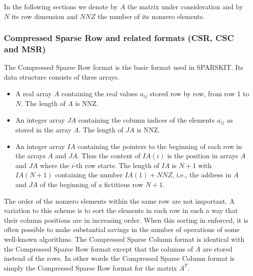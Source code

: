 In the following sections we denote by $A$ the matrix under
consideration and by $N$ its row dimension and $NNZ$ the number of its
nonzero elements.

\subsubsection{Compressed Sparse Row and related formats
 (CSR, CSC and MSR)} The Compressed Sparse Row format is the basic
format used in SPARSKIT. Its  data structure consists of three arrays.

\begin{itemize} 

\item A real array $A$ containing the real values $a_{ij}$ stored row by row,
from row 1 to $N$. The length of $A$ is NNZ.

\item An integer array $JA$ containing the column indices
of the elements $a_{ij}$ as stored in the array $A$.  The length of
$JA$ is NNZ.

\item An integer array $IA$ containing the pointers to the
beginning of each row in the arrays $A$ and $JA$. Thus the content of
$IA(i)$ is the position in arrays $A$ and $JA$ where the $i$-th row
starts.  The length of $IA$ is $N+1$ with $IA(N+1)$ containing the
number $IA(1)+NNZ$, i.e., the address in $A$ and $JA$ of the beginning
of a fictitious row $N+1$.

\end{itemize}
The order of the nonzero elements within the same row are not important. 
A variation to this scheme is to sort the elements in each row 
in such a way that their column positions are in increasing order.
When this sorting in enforced, it is often possible to 
make substantial savings in the number of operations of 
some well-known algorithms. 
The Compressed Sparse Column format is identical with the Compressed
Sparse Row format except that the columns of $A$ are stored instead of
the rows. In other words the Compressed Sparse Column format is simply
the Compressed Sparse Row format for the matrix $A^T$.


